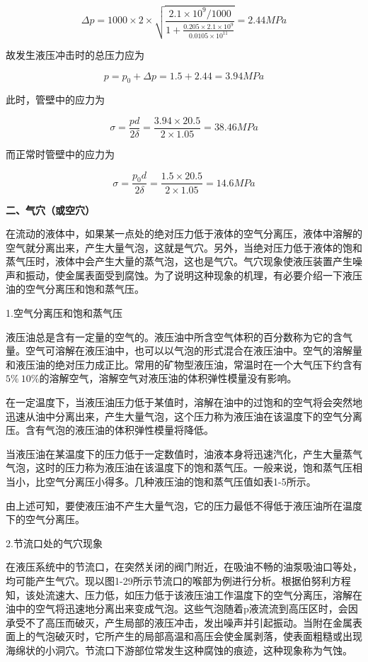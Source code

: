 $$
\varDelta p=1000\times 2\times \sqrt{\frac{2.1\times 10^9/1000}{1+\frac{0.205\times 2.1\times 10^9}{0.0105\times 10^{11}}}}=2.44MPa
$$

\noindent 故发生液压冲击时的总压力应为

$$
p=p_0+\varDelta p=1.5+2.44=3.94MPa
$$

\noindent 此时，管壁中的应力为

$$
\sigma =\frac{pd}{2\delta}=\frac{3.94\times 20.5}{2\times 1.05}=38.46MPa
$$

\noindent 而正常时管壁中的应力为

$$
\sigma =\frac{p_0d}{2\delta}=\frac{1.5\times 20.5}{2\times 1.05}=14.6MPa
$$


\textbf{ 二、气穴（或空穴）}

在流动的液体中，如果某一点处的绝对压力低于液体的空气分离压，液体中溶解的空气就分离出来，产生大量气泡，这就是气穴。另外，当绝对压力低于液体的饱和蒸气压时，液体中会产生大量的蒸气泡，这也是气穴。气穴现象使液压装置产生噪声和振动，使金属表面受到腐蚀。为了说明这种现象的机理，有必要介绍一下液压油的空气分离压和饱和蒸气压。

1.空气分离压和饱和蒸气压

液压油总是含有一定量的空气的。液压油中所含空气体积的百分数称为它的含气量。空气可溶解在液压油中，也可以以气泡的形式混合在液压油中。空气的溶解量和液压油的绝对压力成正比。常用的矿物型液压油，常温时在一个大气压下约含有$5\%~10\%$的溶解空气，溶解空气对液压油的体积弹性模量没有影响。

在一定温度下，当液压油压力低于某值时，溶解在油中的过饱和的空气将会突然地迅速从油中分离出来，产生大量气泡，这个压力称为液压油在该温度下的空气分离压。含有气泡的液压油的体积弹性模量将降低。

当液压油在某温度下的压力低于一定数值时，油液本身将迅速汽化，产生大量蒸气气泡，这时的压力称为液压油在该温度下的饱和蒸气压。一般来说，饱和蒸气压相当小，比空气分离压小得多。几种液压油的饱和蒸气压值如表1-5所示。


由上述可知，要使液压油不产生大量气泡，它的压力最低不得低于液压油所在温度下的空气分离压。

2.节流口处的气穴现象

在液压系统中的节流口，在突然关闭的阀门附近，在吸油不畅的油泵吸油口等处，均可能产生气穴。现以图1-29所示节流口的喉部为例进行分析。根据伯努利方程知，该处流速大、压力低，如压力低于该液压油工作温度下的空气分离压，溶解在油中的空气将迅速地分离出来变成气泡。这些气泡随着p液流流到高压区时，会因承受不了高压而破灭，产生局部的液压冲击，发出噪声并引起振动。当附在金属表面上的气泡破灭时，它所产生的局部高温和高压会使金属剥落，使表面粗糙或出现海绵状的小洞穴。节流口下游部位常发生这种腐蚀的痕迹，这种现象称为气蚀。

